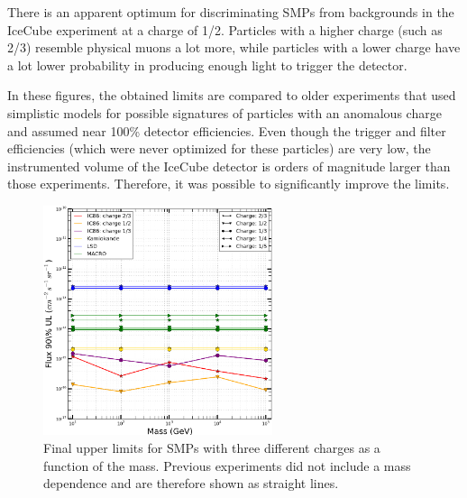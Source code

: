 There is an apparent optimum for discriminating SMPs from backgrounds in the IceCube experiment at a charge of 1/2. Particles with a higher charge (such as 2/3) resemble physical muons a lot more, while particles with a lower charge have a lot lower probability in producing enough light to trigger the detector.

In these figures, the obtained limits are compared to older experiments that used simplistic models for possible signatures of particles with an anomalous charge and assumed near 100\% detector efficiencies. Even though the trigger and filter efficiencies (which were never optimized for these particles) are very low, the instrumented volume of the IceCube detector is orders of magnitude larger than those experiments. Therefore, it was possible to significantly improve the limits.

\begin{figure}
\centering
\includegraphics[width=0.6\textwidth]{chapter8/img/UpperLimitPlot_massesOBSERVED.png}
\caption{Final upper limits for SMPs with three different charges as a function of the mass. Previous experiments did not include a mass dependence and are therefore shown as straight lines.}
\label{fig:moneyplot1}
\end{figure}

